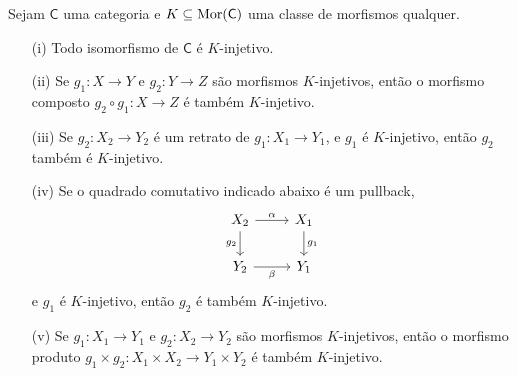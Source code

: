 \begin{prop}\label{prop:props_morfismos_inj}
  Sejam $\mathsf{C}$ uma categoria e $K \subseteq \mathrm{Mor}(\mathsf{C})$ uma classe de morfismos qualquer.
  \begin{enumerate}
    \item[(i)] Todo isomorfismo de $\mathsf{C}$ é $K$-injetivo.
    
    \item[(ii)] Se $g_1: X \to Y$ e $g_2: Y \to Z$ são morfismos $K$-injetivos, então o morfismo composto $g_2 \circ g_1: X \to Z$ é também $K$-injetivo.
    
    \item[(iii)] Se $g_2: X_2 \to Y_2$ é um retrato de $g_1: X_1 \to Y_1$, e $g_1$ é $K$-injetivo, então $g_2$ também é $K$-injetivo.

    \item[(iv)] Se o quadrado comutativo indicado abaixo é um pullback,
    \begin{displaymath}
      \begin{tikzcd}
        X_2
        \arrow[r, "\alpha"]
        \arrow[d, "g_2" swap]
        & X_1
        \arrow[d, "g_1"]
        \\ Y_2
        \arrow[r, "\beta" swap]
        & Y_1
      \end{tikzcd}
    \end{displaymath}
    e $g_1$ é $K$-injetivo, então $g_2$ é também $K$-injetivo.

    \item[(v)] Se $g_1: X_1 \to Y_1$ e $g_2: X_2 \to Y_2$ são morfismos $K$-injetivos, então o morfismo produto $g_1 \times g_2: X_1 \times X_2 \to Y_1 \times Y_2$ é também $K$-injetivo.
  \end{enumerate}
\end{prop}

